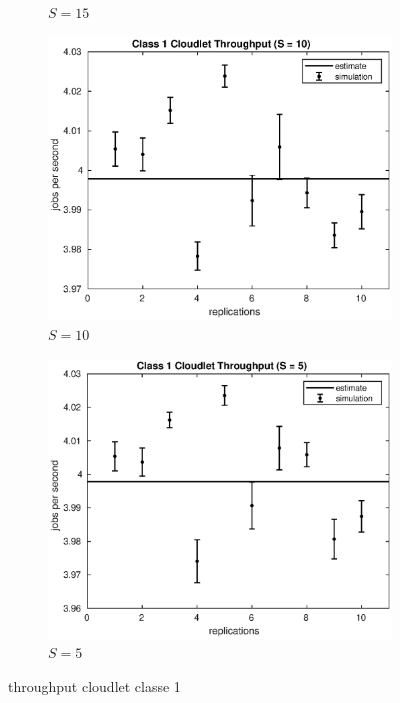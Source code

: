 \begin{figure}[!h]
\begin{subfigure}[t]{0.49\textwidth}
\caption{$S = 15$}
\label{15_x1clet}
\end{subfigure}
%
\begin{subfigure}[t]{0.49\textwidth}
\includegraphics[width=\textwidth]{figures/simul/10_500K_x1clet}
\caption{$S = 10$}
\label{10_x1clet}
\end{subfigure}
%
\begin{subfigure}[t]{0.49\textwidth}
\includegraphics[width=\textwidth]{figures/simul/5_500K_x1clet}
\caption{$S = 5$}
\label{5_x1clet}
\end{subfigure}
%
\caption{throughput cloudlet classe 1}
\label{plot:x1clet}
\end{figure}
%
%

